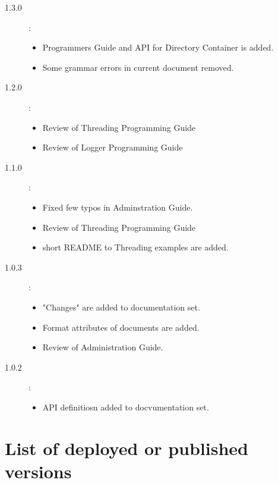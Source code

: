 \documentclass[10pt]{article}
\begin{document}
\begin{description}
 \item [1.3.0]:
       \begin{itemize}
       \item Programmers Guide and API for Directory Container is added.
       \item Some grammar errors in current document removed.
       \end{itemize}

 \item [1.2.0]: 
 \begin{itemize}
   \item Review of Threading Programming Guide
   \item Review of Logger Programming Guide
 \end{itemize}

 \item [1.1.0]: 
 \begin{itemize}
   \item Fixed few typos in Adminstration Guide.
   \item Review of Threading Programming Guide
   \item short README to Threading examples are added.
 \end{itemize}

 \item [1.0.3]: 
 \begin{itemize}
   \item "Changes" are added to documentation set.
   \item Format attributes of documents are added.
   \item Review of Administration Guide.
 \end{itemize} 

 \item [1.0.2]:
 \begin{itemize}
    \item API definitiosn added to docvumentation set.
 \end{itemize} 
\end{description}

\section{ List of deployed or published versions }
\end{document}
